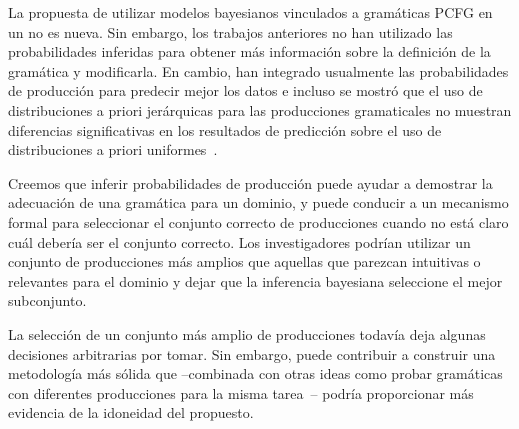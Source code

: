 La propuesta de utilizar modelos bayesianos vinculados a gramáticas PCFG en un \lot no es nueva. Sin embargo, los trabajos anteriores no han utilizado las probabilidades inferidas para obtener más información sobre la definición de la gramática y modificarla. En cambio, han integrado usualmente las probabilidades de producción para predecir mejor los datos e incluso se mostró que el uso de distribuciones a priori jerárquicas para las producciones gramaticales no muestran diferencias significativas en los resultados de predicción sobre el uso de distribuciones a priori uniformes~\cite{piantadosi2012bootstrapping,yildirim2015learning}.


Creemos que inferir probabilidades de producción puede ayudar a demostrar la adecuación de una gramática para un dominio, y puede conducir a un mecanismo formal para seleccionar el conjunto correcto de producciones cuando no está claro cuál debería ser el conjunto correcto. Los investigadores podrían utilizar un conjunto de producciones más amplios que aquellas que parezcan intuitivas o relevantes para el dominio y dejar que la inferencia bayesiana seleccione el mejor subconjunto.


La selección de un conjunto más amplio de producciones todavía deja algunas decisiones arbitrarias por tomar. Sin embargo, puede contribuir a construir una metodología más sólida que --combinada con otras ideas como probar gramáticas con diferentes producciones para la misma tarea~\cite{piantadosi2016logical}-- podría proporcionar más evidencia de la idoneidad del \lot propuesto.


